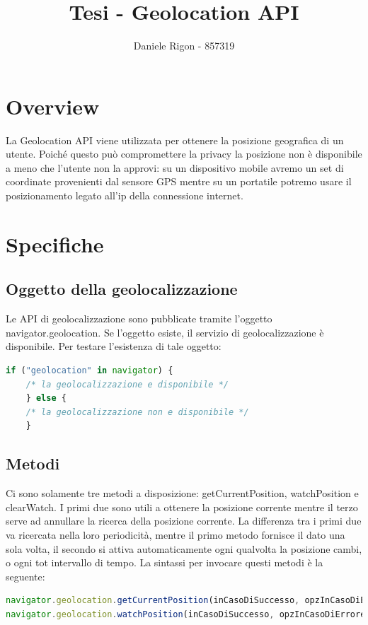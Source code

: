 \documentclass[italian]{article}
\author{
	Daniele Rigon - 857319 \\
}
\begin{document}
	
\title{Tesi - Geolocation API}
\maketitle

\tableofcontents
\pagebreak


\section{Overview}
La Geolocation API viene utilizzata per ottenere la posizione geografica di un utente. 
Poiché questo può compromettere la privacy la posizione non è disponibile a meno che l'utente non la approvi: su un dispositivo mobile avremo un set di coordinate provenienti dal sensore GPS mentre su un portatile potremo usare il posizionamento legato all’ip della connessione internet.

\section{Specifiche}

\subsection{Oggetto della geolocalizzazione}
Le API di geolocalizzazione sono pubblicate tramite l'oggetto navigator.geolocation. Se l'oggetto esiste, il servizio di geolocalizzazione è disponibile. Per testare l'esistenza di tale oggetto:
\begin{lstlisting}[language=JavaScript]
	if ("geolocation" in navigator) {
	/* la geolocalizzazione e disponibile */
	} else {
	/* la geolocalizzazione non e disponibile */
	}
\end{lstlisting}

\subsection{Metodi}
Ci sono solamente tre metodi a disposizione: getCurrentPosition, watchPosition e clearWatch. I primi due sono utili a ottenere la posizione corrente mentre il terzo serve ad annullare la ricerca della posizione corrente. 
La differenza tra i primi due va ricercata nella loro periodicità, mentre il primo metodo fornisce il dato una sola volta, il secondo si attiva automaticamente ogni qualvolta la posizione cambi, o ogni tot intervallo di tempo.
La sintassi per invocare questi metodi è la seguente:
\begin{lstlisting}[language=JavaScript]
navigator.geolocation.getCurrentPosition(inCasoDiSuccesso, opzInCasoDiErrore, opzioni); 
navigator.geolocation.watchPosition(inCasoDiSuccesso, opzInCasoDiErrore, opzioni);
\end{lstlisting}
\end{document}
